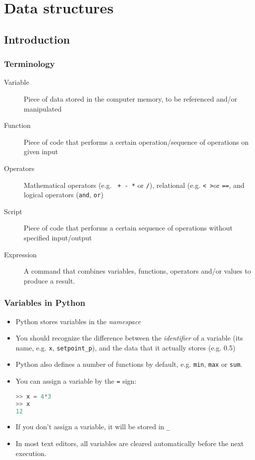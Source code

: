 \section{Data structures}
\subsection*{Introduction}
\begin{frame}
 \frametitle{Terminology}
 \begin{description}
  \item[Variable] Piece of data stored in the computer memory, to be referenced and/or manipulated
  \item[Function] Piece of code that performs a certain operation/sequence of operations on given input
  \item[Operators] Mathematical operators (e.g. \lstinline$ + - *$ or \lstinline$/$), relational (e.g. \lstinline$< >$or \lstinline$==$, and logical operators (\lstinline$and$, \lstinline$or$)
  \item[Script] Piece of code that performs a certain sequence of operations without specified input/output
  \item[Expression] A command that combines variables, functions, operators and/or values to produce a result.
 \end{description}
\end{frame}

\begin{frame}[fragile]
 \frametitle{Variables in Python}
  \begin{itemize}
   \item Python stores variables in the \emph{namespace}\pause
   \item You should recognize the difference between the \emph{identifier} of a variable (its name, e.g. \lstinline$x$, \lstinline$setpoint_p$), and the data that it actually stores (e.g. 0.5)\pause
   \item Python also defines a number of functions by default, e.g. \lstinline$min$, \lstinline$max$ or \lstinline$sum$.\pause
   \item You can assign a variable by the \lstinline$=$ sign:
   \begin{lstlisting}[language=Python, numbers=none]
>> x = 4*3
>> x
12
   \end{lstlisting}\pause
   \item If you don't assign a variable, it will be stored in \lstinline$_$
   \item In most text editors, all variables are cleared automatically before the next execution. 
 \end{itemize}
\end{frame}

